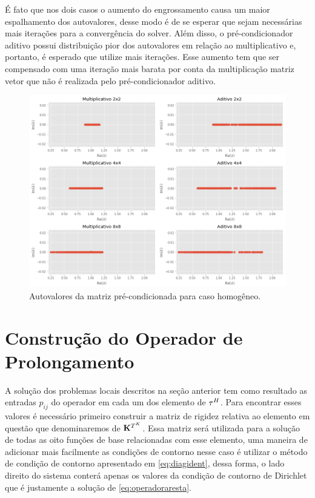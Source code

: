 É fato que nos dois casos o aumento do engrossamento causa um maior espalhamento dos autovalores, desse modo é de se esperar que sejam necessárias mais iterações para a convergência do solver. Além disso, o pré-condicionador aditivo possui distribuição pior dos autovalores em relação ao multiplicativo e, portanto, é esperado que utilize mais iterações. Esse aumento tem que ser compensado com uma iteração mais barata por conta da multiplicação matriz vetor que não é realizada pelo pré-condicionador aditivo.


\begin{figure}[!htbp]
\centering
\includegraphics[width=\textwidth]{chap06/figs/AutovaloresMatPrecondicionada.png}
\caption{Autovalores da matriz pré-condicionada para caso homogêneo.}
\label{fig:autovaloresMatrizPrecon}
\end{figure}

\section{Construção do Operador de Prolongamento}

A solução dos problemas locais descritos na seção anterior tem como resultado as entradas $p_{ij}$ do operador em cada um dos elemento de $\tau^H$. Para encontrar esses valores é necessário primeiro construir a matriz de rigidez relativa ao elemento em questão que denominaremos de $\mathbf{K}^{T^K}$. Essa matriz será utilizada para a solução de todas as oito funções de base relacionadas com esse elemento, uma maneira de adicionar mais facilmente as condições de contorno nesse caso é utilizar o método de condição de contorno apresentado em \eqref{eq:diagident}, dessa forma, o lado direito do sistema conterá apenas os valores da condição de contorno de Dirichlet que é justamente a solução de \eqref{eq:operadoraresta}.


